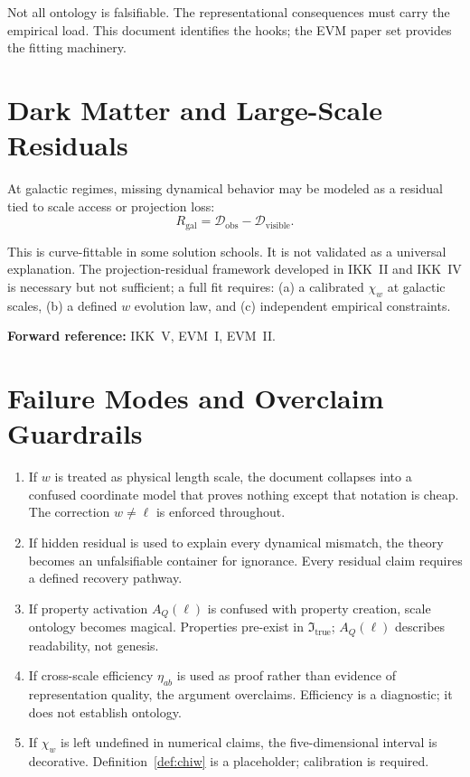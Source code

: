 \documentclass[11pt,a4paper,oneside]{article}
\newcommand{\Itrue}{\mathfrak{I}_{\mathrm{true}}}   %
\newcommand{\wcoord}{w}
\newcommand{\etaab}{\eta_{ab}}                 %
\newcommand{\AQ}{A_Q(\ell)}                    %
\newcommand{\chiw}{\chi_w}                     %
\begin{document}
Not all ontology is falsifiable. The representational consequences must carry the empirical load. This document identifies the hooks; the EVM paper set provides the fitting machinery.

\section{Dark Matter and Large-Scale Residuals}

At galactic regimes, missing dynamical behavior may be modeled as a residual tied to scale access or projection loss:
\[
R_{\mathrm{gal}} = \mathcal{D}_{\mathrm{obs}} - \mathcal{D}_{\mathrm{visible}}.
\]

This is curve-fittable in some solution schools. It is not validated as a universal explanation. The projection-residual framework developed in IKK~II and IKK~IV is necessary but not sufficient; a full fit requires: (a) a calibrated $\chiw$ at galactic scales, (b) a defined $\wcoord$ evolution law, and (c) independent empirical constraints.

\textbf{Forward reference:} IKK~V, EVM~I, EVM~II.

\section{Failure Modes and Overclaim Guardrails}

\begin{enumerate}
\item If $\wcoord$ is treated as physical length scale, the document collapses into a confused coordinate model that proves nothing except that notation is cheap. The correction $\wcoord \neq \ell$ is enforced throughout.
\item If hidden residual is used to explain every dynamical mismatch, the theory becomes an unfalsifiable container for ignorance. Every residual claim requires a defined recovery pathway.
\item If property activation $\AQ$ is confused with property creation, scale ontology becomes magical. Properties pre-exist in $\Itrue$; $\AQ$ describes readability, not genesis.
\item If cross-scale efficiency $\etaab$ is used as proof rather than evidence of representation quality, the argument overclaims. Efficiency is a diagnostic; it does not establish ontology.
\item If $\chiw$ is left undefined in numerical claims, the five-dimensional interval is decorative. Definition~\ref{def:chiw} is a placeholder; calibration is required.
\end{enumerate}
\end{document}
